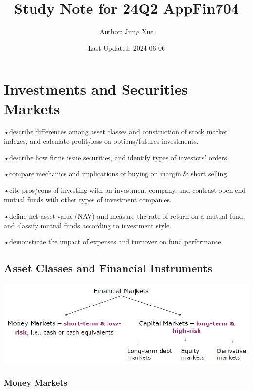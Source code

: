 \documentclass[
]{book}
\title{Study Note for 24Q2 AppFin704}
\author{Author: Jung Xue}
\date{Last Updated: 2024-06-06}
\begin{document}
\frontmatter
\maketitle

\mainmatter
\hypertarget{ch1}{%
\chapter{Investments and Securities Markets}\label{ch1}}

•describe differences among asset classes and construction of stock
market indexes, and calculate profit/loss on options/futures
investments.

•describe how firms issue securities, and identify types of investors'
orders

•compare mechanics and implications of buying on margin \& short selling

•cite pros/cons of investing with an investment company, and contrast
open end mutual funds with other types of investment companies.

•define net asset value (NAV) and measure the rate of return on a mutual
fund, and classify mutual funds according to investment style.

•demonstrate the impact of expenses and turnover on fund performance

\hypertarget{asset-classes-and-financial-instruments}{%
\section{Asset Classes and Financial
Instruments}\label{asset-classes-and-financial-instruments}}

\includegraphics{Resources/Financialmarkets.png}

\hypertarget{money-markets}{%
\subsection{Money Markets}\label{money-markets}}
\end{document}
